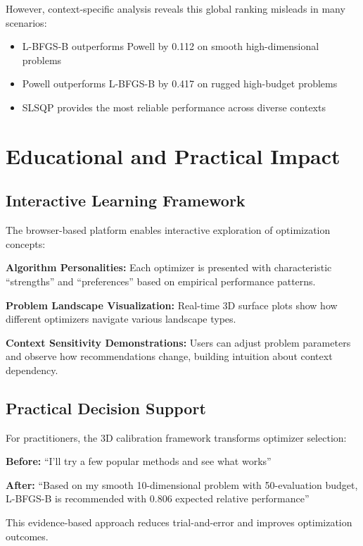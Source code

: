 \documentclass[article]{jss}
\begin{document}
However, context-specific analysis reveals this global ranking misleads in many scenarios:
\begin{itemize}
\item L-BFGS-B outperforms Powell by 0.112 on smooth high-dimensional problems
\item Powell outperforms L-BFGS-B by 0.417 on rugged high-budget problems
\item SLSQP provides the most reliable performance across diverse contexts
\end{itemize}

\section{Educational and Practical Impact} \label{sec:impact}

\subsection{Interactive Learning Framework}

The browser-based platform enables interactive exploration of optimization concepts:

\textbf{Algorithm Personalities:} Each optimizer is presented with characteristic ``strengths'' and ``preferences'' based on empirical performance patterns.

\textbf{Problem Landscape Visualization:} Real-time 3D surface plots show how different optimizers navigate various landscape types.

\textbf{Context Sensitivity Demonstrations:} Users can adjust problem parameters and observe how recommendations change, building intuition about context dependency.

\subsection{Practical Decision Support}

For practitioners, the 3D calibration framework transforms optimizer selection:

\textbf{Before:} ``I'll try a few popular methods and see what works''

\textbf{After:} ``Based on my smooth 10-dimensional problem with 50-evaluation budget, L-BFGS-B is recommended with 0.806 expected relative performance''

This evidence-based approach reduces trial-and-error and improves optimization outcomes.
\end{document}
